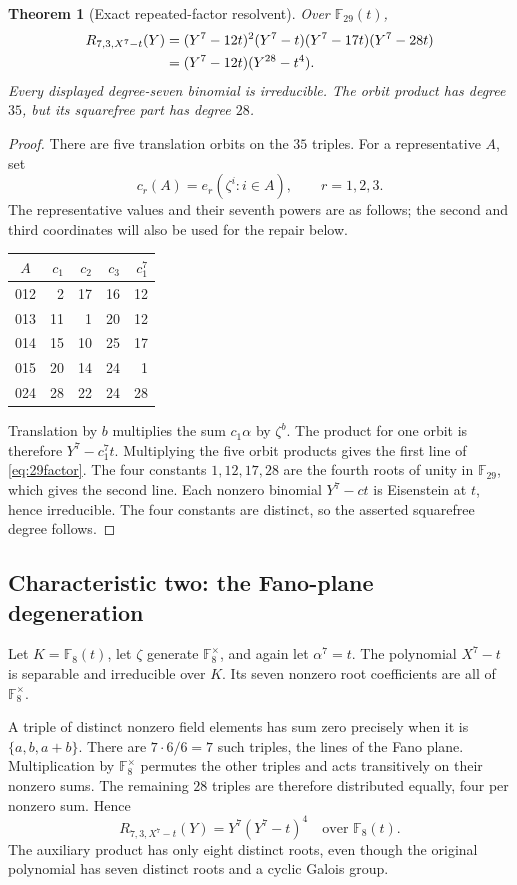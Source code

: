 \documentclass[11pt,a4paper]{article}
\newtheorem{theorem}{Theorem}[section]
\theoremstyle{definition}
\theoremstyle{remark}
\newcommand{\F}{\mathbb F}
\begin{document}
\begin{theorem}[Exact repeated-factor resolvent]\label{thm:29}
Over $\F_{29}(t)$,
\begin{align}
 R_{7,3,X^7-t}(Y)
 &= (Y^7-12t)^2(Y^7-t)(Y^7-17t)(Y^7-28t)\notag\\
 &= (Y^7-12t)(Y^{28}-t^4).
 \label{eq:29factor}
\end{align}
Every displayed degree-seven binomial is irreducible. The orbit product
has degree $35$, but its squarefree part has degree $28$.
\end{theorem}
\begin{proof}
There are five translation orbits on the $35$ triples. For a representative
$A$, set
\[
 c_r(A)=e_r(\zeta^i:i\in A),\qquad r=1,2,3.
\]
The representative values and their seventh powers are as follows; the
second and third coordinates will also be used for the repair below.
\begin{center}
\begin{tabular}{@{}crrrr@{}}
\toprule
$A$&$c_1$&$c_2$&$c_3$&$c_1^7$\\
\midrule
012&2&17&16&12\\
013&11&1&20&12\\
014&15&10&25&17\\
015&20&14&24&1\\
024&28&22&24&28\\
\bottomrule
\end{tabular}
\end{center}
Translation by $b$ multiplies the sum $c_1\alpha$ by $\zeta^b$.
The product for one orbit is therefore $Y^7-c_1^7t$. Multiplying the five
orbit products gives the first line of \eqref{eq:29factor}. The four
constants $1,12,17,28$ are the fourth roots of unity in $\F_{29}$, which
gives the second line. Each nonzero binomial $Y^7-ct$ is Eisenstein at $t$,
hence irreducible. The four constants are distinct, so the asserted
squarefree degree follows.
\end{proof}

\subsection{Characteristic two: the Fano-plane degeneration}

Let $K=\F_8(t)$, let $\zeta$ generate $\F_8^\times$, and again let
$\alpha^7=t$. The polynomial $X^7-t$ is separable and irreducible over $K$.
Its seven nonzero root coefficients are all of $\F_8^\times$.

A triple of distinct nonzero field elements has sum zero precisely when it
is $\{a,b,a+b\}$. There are $7\cdot6/6=7$ such triples, the lines of the
Fano plane. Multiplication by $\F_8^\times$ permutes the other triples and
acts transitively on their nonzero sums. The remaining $28$ triples are
therefore distributed equally, four per nonzero sum. Hence
\begin{equation}
 R_{7,3,X^7-t}(Y)=Y^7(Y^7-t)^4\quad\text{over }\F_8(t).
 \label{eq:char2}
\end{equation}
The auxiliary product has only eight distinct roots, even though the
original polynomial has seven distinct roots and a cyclic Galois group.
\end{document}
